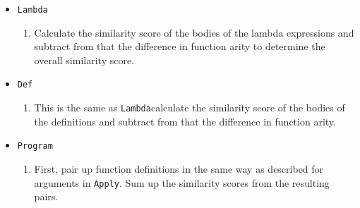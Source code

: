 \documentclass[12pt]{article}
\newcommand{\key}[1]{\texttt{#1}}
\begin{document}
\begin{itemize}
\begin{adjustwidth}{5mm}{}
\begin{enumerate}
\item     Take the first argument from \key{args1}. Compare it to each argument from \key{args2} and pick the argument that has the highest similarity score. Remove that argument from \key{args2}.

\item     Take the next argument from \key{args1} and repeat the previous step again.

\item     Do so until all pairings have been made. Sum up the similarity scores from the resulting pairs and the similarity score of the applied functions to achieve a tentative similarity score.

\item     If there are excess unpaired arguments, sum up the similarity caps of the excess arguments and subtract that from the tentative score above (with a minimum total score value of 0). The resulting value is the similarity score of the \key{Apply} structures.
  \end{enumerate}
    \end{adjustwidth}

  \item\key{Lambda}
    \begin{adjustwidth}{5mm}{}
      \begin{enumerate}
        \item Calculate the similarity score of the bodies of the lambda expressions and subtract from that the difference in function arity to determine the overall similarity score.
  \end{enumerate}
    \end{adjustwidth}

  \item\key{Def}
    \begin{adjustwidth}{5mm}{}
      \begin{enumerate}
\item     This is the same as \key{Lambda}\textemdash calculate the similarity score of the bodies of the definitions and subtract from that the difference in function arity.
  \end{enumerate}
    \end{adjustwidth}

  \item\key{Program}
    \begin{adjustwidth}{5mm}{}
      \begin{enumerate}
\item     First, pair up function definitions in the same way as described for arguments in \key{Apply}. Sum up the similarity scores from the resulting pairs.


\end{enumerate}
\end{adjustwidth}
\end{itemize}
\end{document}
